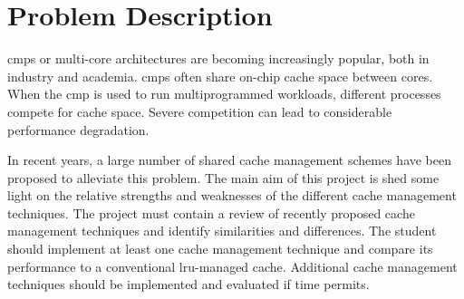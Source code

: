 
\section*{Problem Description}
\glspl{cmp} or multi-core architectures are becoming increasingly popular, both in industry and academia. 
\glspl{cmp} often share on-chip cache space between cores. 
When the \gls{cmp} is used to run multiprogrammed workloads, different processes compete for cache space. 
Severe competition can lead to considerable performance degradation. 

In recent years, a large number of shared cache management schemes have been proposed to alleviate this problem.
The main aim of this project is shed some light on the relative strengths and weaknesses of the different cache management techniques. 
The project must contain a review of recently proposed cache management techniques and identify similarities and differences. 
The student should implement at least one cache management technique and compare its performance to a conventional \gls{lru}-managed cache.
Additional cache management techniques should be implemented and evaluated if time permits.

\clearpage